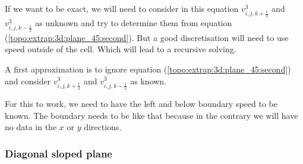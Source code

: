 If we want to be exact, we will need to consider in this equation  $v^{3}_{i,j,k+\frac{1}{2}}$ and $v^{3}_{i,j,k-\frac{1}{2}}$
as unknown and try to determine them from equation (\ref{topo:extrap:3d:plane_45:second}).
But a good discretisation will need to use speed outside of the cell. Which will lead to a recursive solving.

A first approximation is to ignore equation (\ref{topo:extrap:3d:plane_45:second}) and consider $v^{3}_{i,j,k+\frac{1}{2}}$ and $v^{3}_{i,j,k-\frac{1}{2}}$ as known.

% 
% 


For this to work, we need to have the left and below boundary speed to be known.
The boundary needs to be like that because in the contrary we will have no data in the $x$ or $y$ directions.


\subsubsection{Diagonal sloped plane}

